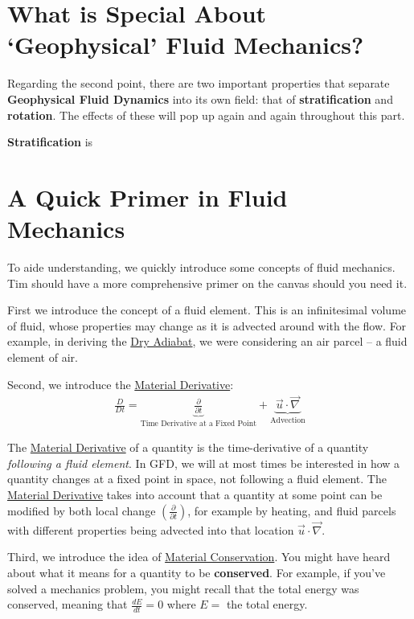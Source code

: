 \section{What is Special About `Geophysical' Fluid Mechanics?}

Regarding the second point, there are two important properties that separate \textbf{Geophysical Fluid Dynamics} into its own field: that of \textbf{stratification} and \textbf{rotation}. The effects of these will pop up again and again throughout this part.

\textbf{Stratification} is 

\section{A Quick Primer in Fluid Mechanics}

To aide understanding, we quickly introduce some concepts of fluid mechanics. Tim should have a more comprehensive primer on the canvas should you need it.

First we introduce the concept of a fluid element. This is an infinitesimal volume of fluid, whose properties may change as it is advected around with the flow. For example, in deriving the \hyperref[Dry Adiabat]{Dry Adiabat}, we were considering an air parcel – a fluid element of air. 

Second, we introduce the \hyperref[Material Derivative]{Material Derivative}:
\begin{align}
    \frac{D}{Dt}=\underbrace{\frac{\partial}{\partial t}}_{\text{Time Derivative at a Fixed Point}}+\underbrace{\vec{u}\cdot\vec{\nabla}}_{\text{Advection}}
    \label{Material Derivative}
\end{align}

The \hyperref[Material Derivative]{Material Derivative} of a quantity is the time-derivative of a quantity \textit{following a fluid element}. In GFD, we will at most times be interested in how a quantity changes at a fixed point in space, not following a fluid element. The \hyperref[Material Derivative]{Material Derivative} takes into account that a quantity at some point can be modified by both local change $\left( \frac{\partial}{\partial t} \right)$, for example by heating, and fluid parcels with different properties being advected into that location $\vec{u}\cdot\vec{\nabla}$.

Third, we introduce the idea of \hyperref[Material Conservation]{Material Conservation}. You might have heard about what it means for a quantity to be \textbf{conserved}. For example, if you've solved a mechanics problem, you might recall that the total energy was conserved, meaning that $\frac{dE}{dt}=0$ where $E=$ the total energy.

